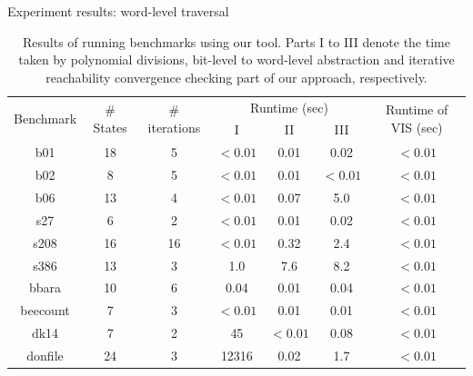 \documentclass[xcolor=dvipsnames]{beamer}
\begin{document}
\begin{frame}{\large{Experiment results: word-level traversal}}
\begin{table}[H]
\centering
\caption{Results of running benchmarks using our tool. 
\small{Parts I to III denote the time taken by polynomial divisions,
  bit-level to word-level abstraction and iterative reachability
  convergence checking part of our approach, respectively.}}
{\small 
\begin{tabular}{|c||c|c|c|c|c|c|}
\hline
\multirow{3}{*}{\centering Benchmark} 
 & \multirow{3}{0.9cm}{\centering \# States}
 & \multirow{3}{1.3cm}{\centering \# iterations}
 & \multicolumn{3}{c|}{\multirow{2}{2.0cm}{\centering Runtime (sec)}}
 & \multirow{3}{1.8cm}{\centering Runtime of VIS (sec)} \\
   & & &\multicolumn{3}{c|}{}& \\
  \cline{4-6}
     & & & I & II & III & \\
\hline
\hline
b01 & 18  & 5  & $<0.01$ & 0.01 & 0.02 & $<0.01$\\
b02 & 8 & 5 & $<0.01$  & 0.01 & $<0.01$ & $<0.01$ \\
b06 & 13 & 4 & $<0.01$ & 0.07 & 5.0 & $<0.01$ \\
s27 & 6 & 2 & $<0.01$ & 0.01 & 0.02  & $<0.01$  \\
s208 & 16 & 16 & $<0.01$ & 0.32 & 2.4 & $<0.01$ \\
s386 & 13  & 3 & 1.0 & 7.6 & 8.2  & $<0.01$ \\
bbara & 10 & 6 & 0.04 & 0.01 & 0.04  & $<0.01$ \\
beecount & 7  & 3  &$<0.01$ & 0.01 & 0.01 & $<0.01$ \\
dk14 & 7  & 2  & 45 & $<0.01$ & 0.08 & $<0.01$\\
donfile & 24 & 3  & 12316 & 0.02 & 1.7  & $<0.01$\\
\hline
\end{tabular}
}
\label{tab:result}  
\end{table} 
\end{frame}
\end{document}
